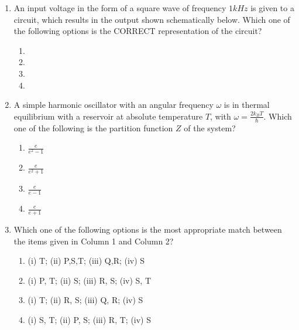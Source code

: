 \documentclass[journal,12pt,onecolumn]{IEEEtran}
\theoremstyle{remark}
\begin{document}
\begin{enumerate}
\item An input voltage in the form of a square wave of frequency $1 kHz$ is given to a circuit, which results in the output shown schematically below. Which one of the following options is the CORRECT representation of the circuit?




\begin{enumerate}
\item 
\item 
\item 
\item 
\end{enumerate}

\item A simple harmonic oscillator with an angular frequency $\omega$ is in thermal equilibrium with a reservoir at absolute temperature $T$, with $\omega = \frac{2 k_{B} T}{\hbar}$. Which one of the following is the partition function $Z$ of the system?
\begin{enumerate}
\item $\frac{e}{e^{2} - 1}$
\item $\frac{e}{e^{2}  + 1}$
\item $\frac{e}{e - 1}$
\item $\frac{e}{e + 1}$
\end{enumerate}

\item Which one of the following options is the most appropriate match between the items given in Column 1 and Column 2?



\begin{enumerate}
    \item (i) T; (ii) P,S,T; (iii) Q,R; (iv) S
    \item (i) P, T; (ii) S; (iii) R, S; (iv) S, T
    \item (i) T; (ii) R, S; (iii) Q, R; (iv) S
    \item (i) S, T; (ii) P, S; (iii) R, T; (iv) S
\end{enumerate}


\end{enumerate}
\end{document}
